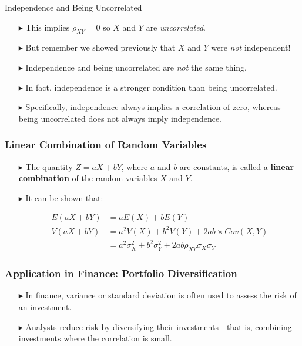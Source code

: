 \documentclass[12pt]{beamer}
\begin{document}
\begin{frame}{Independence and Being Uncorrelated}

\begin{itemize}
	\item[\color{blue}$\blacktriangleright$]This implies $\rho_{XY} = 0$ so $X$ and $Y$ are \emph{uncorrelated}.
	\item[\color{blue}$\blacktriangleright$]But remember we showed previously that $X$ and $Y$ were \emph{not} independent!
	\item[\color{blue}$\blacktriangleright$]Independence and being uncorrelated are \emph{not} the same thing.
	\item[\color{blue}$\blacktriangleright$]In fact, independence is a stronger condition than being uncorrelated.
	\item[\color{blue}$\blacktriangleright$]Specifically, independence always implies a correlation of zero, whereas being uncorrelated does not always imply independence.
\end{itemize}
\end{frame}

\begin{frame}
	\frametitle{Linear Combination of Random Variables}
	
	\begin{itemize}
		\item[\color{blue}$\blacktriangleright$]The quantity $Z = aX + bY$, where $a$ and $b$ are constants, is called a \textbf{linear combination} of the random variables $X$ and $Y$.
		\item[\color{blue}$\blacktriangleright$]It can be shown that:
		
		\begin{align*}
			E(aX + bY) &= aE(X) + bE(Y) \\[1ex]
			V(aX + bY) &= a^2V(X) + b^2V(Y) + 2ab \times Cov(X, Y) \\
			&= a^2\sigma_X^2 + b^2\sigma_Y^2 + 2ab\rho_{XY}\sigma_X\sigma_Y
		\end{align*}
		
	\end{itemize}
	
\end{frame}

\begin{frame}
	\frametitle{Application in Finance: Portfolio Diversification}
	
	\begin{itemize}
		\item[\color{blue}$\blacktriangleright$]In finance, variance or standard deviation is often used to assess the risk of an investment.
		\item[\color{blue}$\blacktriangleright$]Analysts reduce risk by diversifying their investments - that is, combining investments where the correlation is small.
	\end{itemize}
	
	
	
\end{frame}
\end{document}
